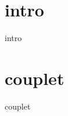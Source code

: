 
\songbooksongstruct

\newpage

\begin{multicols}{2}
	\xxxlyrics
\end{multicols}

\newpage
\section*{intro}
{intro}
\section*{couplet}
{couplet}
